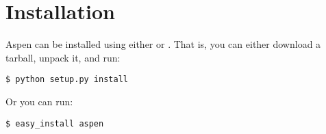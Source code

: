 \chapter{Installation \label{installation}}

Aspen can be installed using either  or .
That is, you can either download a tarball, unpack it, and run:

\begin{verbatim}
$ python setup.py install
\end{verbatim}

Or you can run:

\begin{verbatim}
$ easy_install aspen
\end{verbatim}
